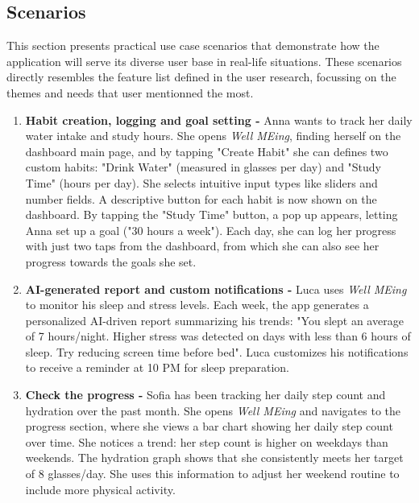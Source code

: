 \documentclass{article}
\begin{document}
\subsection{Scenarios}

This section presents practical use case scenarios that demonstrate how the application will serve its diverse user base in real-life situations.
These scenarios directly resembles the feature list defined in the user research, focussing on the themes and needs that user mentionned the most.

\vspace{5pt}
\begin{enumerate}[label=\textbf{S\arabic* -}]
    \setlength{\itemsep}{5pt}

    \item \textbf{Habit creation, logging and goal setting -}
        Anna wants to track her daily water intake and study hours.
        She opens \textit{Well MEing}, finding herself on the dashboard main page, and by tapping "Create Habit" she can defines two custom habits: "Drink Water" (measured in glasses per day) and "Study Time" (hours per day).
        She selects intuitive input types like sliders and number fields.
        A descriptive button for each habit is now shown on the dashboard.
        By tapping the "Study Time" button, a pop up appears, letting Anna set up a goal ("30 hours a week").
        Each day, she can log her progress with just two taps from the dashboard, from which she can also see her progress towards the goals she set.

    \item \textbf{AI-generated report and custom notifications -}
        Luca uses \textit{Well MEing} to monitor his sleep and stress levels.
        Each week, the app generates a personalized AI-driven report summarizing his trends: "You slept an average of 7 hours/night. Higher stress was detected on days with less than 6 hours of sleep. Try reducing screen time before bed".
        Luca customizes his notifications to receive a reminder at 10 PM for sleep preparation.

    \item \textbf{Check the progress -}
        Sofia has been tracking her daily step count and hydration over the past month.
        She opens \textit{Well MEing} and navigates to the progress section, where she views a bar chart showing her daily step count over time.
        She notices a trend: her step count is higher on weekdays than weekends.
        The hydration graph shows that she consistently meets her target of 8 glasses/day.
        She uses this information to adjust her weekend routine to include more physical activity.


\end{enumerate}
\end{document}

